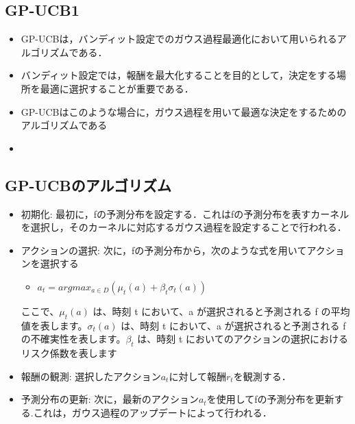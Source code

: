 \documentclass[dvipdfmx, 10.5pt]{beamer}
\begin{document}
\subsection{GP-UCB1}

\begin{frame}{\insertsubsection}
	\begin{itemize}
		\item GP-UCBは，バンディット設定でのガウス過程最適化において用いられるアルゴリズムである．
		\item バンディット設定では，報酬を最大化することを目的として，決定をする場所を最適に選択することが重要である．
		\item GP-UCBはこのような場合に，ガウス過程を用いて最適な決定をするためのアルゴリズムである
		\item 
	\end{itemize}

\end{frame}

\subsection{GP-UCBのアルゴリズム}
\begin{frame}{\insertsubsection}
	\begin{itemize}
		\item 初期化: 最初に，fの予測分布を設定する．これはfの予測分布を表すカーネルを選択し，そのカーネルに対応するガウス過程を設定することで行われる．
		\item アクションの選択: 次に，fの予測分布から，次のような式を用いてアクションを選択する
		\begin{itemize}
			\item $a_t = argmax_{a \in D} (\mu_t(a) + \beta_t \sigma_t(a))$
		\end{itemize}
		ここで、$\mu_t(a)$ は、時刻 t において、a が選択されると予測される f の平均値を表します。$\sigma_t(a)$ は、時刻 t において、a が選択されると予測される f の不確実性を表します。$\beta_t$ は、時刻 t においてのアクションの選択におけるリスク係数を表します
		\item 報酬の観測: 選択したアクション$a_t$に対して報酬$r_t$を観測する．
		\item 予測分布の更新: 次に，最新のアクション$a_t$を使用してfの予測分布を更新する.これは，ガウス過程のアップデートによって行われる．
	\end{itemize}

\end{frame}
\end{document}
